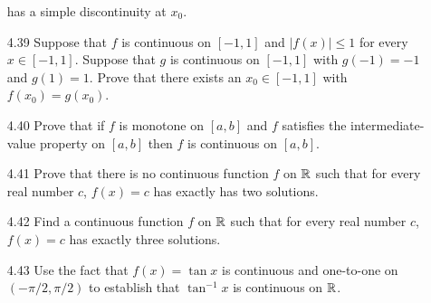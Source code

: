 \begin{enumerate}
               has a simple discontinuity at $x_0$.
   \item[4.39] Suppose that $f$ is continuous on $[-1, 1]$ and $|f(x)| \le 1$
               for every $x \in [-1, 1]$. Suppose that $g$ is continuous on
               $[-1, 1]$ with $g(-1) = -1$ and $g(1) = 1$. Prove that there
               exists an $x_0 \in [-1, 1]$ with $f(x_0) = g(x_0)$.
   \item[4.40] Prove that if $f$ is monotone on $[a, b]$ and $f$ satisfies the
               intermediate-value property on $[a, b]$ then $f$ is continuous on
               $[a, b]$.
   \item[4.41] Prove that there is no continuous function $f$ on $\mathbb{R}$ such that
               for every real number $c$, $f(x) = c$ has exactly has two
               solutions.
   \item[4.42] Find a continuous function $f$ on $\mathbb{R}$ such that for every real
               number $c$, $f(x) = c$ has exactly three solutions.
   \item[4.43] Use the fact that $f(x) = \tan x$ is continuous and one-to-one on
               $(-\pi/2, \pi/2)$ to establish that $\tan^{-1} x$ is continuous
               on $\mathbb{R}$.
\end{enumerate}

